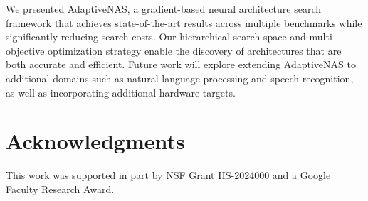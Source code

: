 \documentclass[12pt]{article}
\begin{document}
We presented AdaptiveNAS, a gradient-based neural architecture search framework that achieves state-of-the-art results across multiple benchmarks while significantly reducing search costs. Our hierarchical search space and multi-objective optimization strategy enable the discovery of architectures that are both accurate and efficient. Future work will explore extending AdaptiveNAS to additional domains such as natural language processing and speech recognition, as well as incorporating additional hardware targets.

\section*{Acknowledgments}

This work was supported in part by NSF Grant IIS-2024000 and a Google Faculty Research Award.


% 
\end{document}
